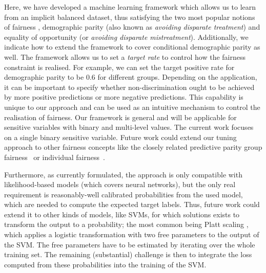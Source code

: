 Here, we have developed a machine learning framework which allows us to learn from an implicit balanced dataset,
thus satisfying the two most popular notions of fairness \citep{verma2018fairness}, demographic parity
(also known as \emph{avoiding disparate treatment}) and equality of opportunity (or \emph{avoiding disparate mistreatment}).
Additionally, we indicate how to extend the framework to cover conditional demographic parity as well.
The framework allows us to set a \emph{target rate} to control how the fairness constraint is realised.
For example, we can set the target positive rate for demographic parity to be $0.6$ for different groups.
Depending on the application, it can be important to specify
whether non-discrimination ought to be achieved by more positive predictions or more negative predictions.
%
This capability is unique to our approach and can be used as an intuitive mechanism to control the realisation of fairness.
Our framework is general and will be applicable for sensitive variables with binary and multi-level values.
The current work focuses on a single binary sensitive variable. %
Future work could extend our tuning approach to other fairness concepts like the closely related predictive parity group fairness~\citep{chouldechova2017fair}
or individual fairness~\citep{dwork2012fairness}.

Furthermore, as currently formulated, the approach is only compatible with likelihood-based models
(which covers neural networks),
but the only real requirement is reasonably-well calibrated probabilities from the used model,
which are needed to compute the expected target labels.
Thus, future work could extend it to other kinds of models, like \acp{SVM},
for which solutions exists to transform the output to a probability;
the most common being Platt scaling \citep{platt1999probabilistic},
which applies a logistic transformation with two free parameters to the output of the \ac{SVM}.
The free parameters have to be estimated by iterating over the whole training set.
The remaining (substantial) challenge is then
to integrate the loss computed from these probabilities into the training of the \ac{SVM}.


